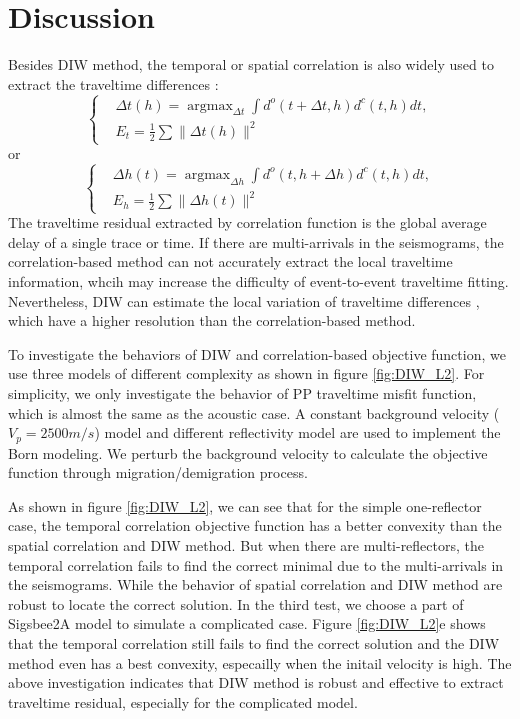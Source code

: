 \section{Discussion}
Besides DIW method, the temporal or spatial correlation is also widely used to extract the
traveltime differences \cite[]{vanLeeuwen:2010,chi2015,Wang2015}:
\begin{equation}
\left\{
	\begin{aligned}
		&\Delta t(h)=\mathop{\arg\max}_{\Delta t}\int d^{o}(t+\Delta t,h)d^{c}(t,h)dt,\\
	&E_t=\frac{1}{2}\sum\parallel \Delta t(h)\parallel ^2
	\end{aligned}
	\right.
    \label{eq:Obj_TimeCorr} 
\end{equation}
or 
\begin{equation}
\left\{
	\begin{aligned}
		&\Delta h(t)=\mathop{\arg\max}_{\Delta h}\int d^{o}(t,h+\Delta h)d^{c}(t,h)dt,\\
	&E_h=\frac{1}{2}\sum\parallel \Delta h(t)\parallel ^2
	\end{aligned}
	\right.
    \label{eq:Obj_SpatialCorr} 
\end{equation}
The traveltime residual extracted by correlation function is the global average delay of a single trace or time.
If there are multi-arrivals in the seismograms, the correlation-based method can not
accurately extract the local traveltime information, 
whcih may increase the difficulty of event-to-event traveltime fitting.
Nevertheless, DIW can estimate the local variation of traveltime differences
, which have a higher resolution than the correlation-based method.

To investigate the behaviors of DIW and correlation-based objective function, we use three 
models of different complexity as shown in figure \ref{fig:DIW_L2}. 
For simplicity,
we only investigate the behavior of PP traveltime misfit
function, which is almost the same as the acoustic case. 
A constant background velocity ($V_p=2500m/s$) model and different reflectivity model
are used to implement the Born modeling. We perturb the background velocity to calculate the
objective function through migration/demigration process. 

As shown in figure \ref{fig:DIW_L2}, we can see that for the simple one-reflector case, the temporal correlation objective function 
has a better convexity than the spatial correlation and DIW method. But when there are
multi-reflectors, the temporal correlation fails to find the correct minimal due to the
multi-arrivals in the seismograms. While the behavior of spatial correlation and DIW method are
robust to locate the correct solution. In the third test, we choose a part of Sigsbee2A model to
simulate a complicated case. Figure \ref{fig:DIW_L2}e shows that the temporal correlation still
fails to find the correct solution and the DIW method even has a best convexity, especailly when the initail velocity is high. The above investigation indicates that
DIW method is robust and effective to extract traveltime residual, especially for the complicated
model.
